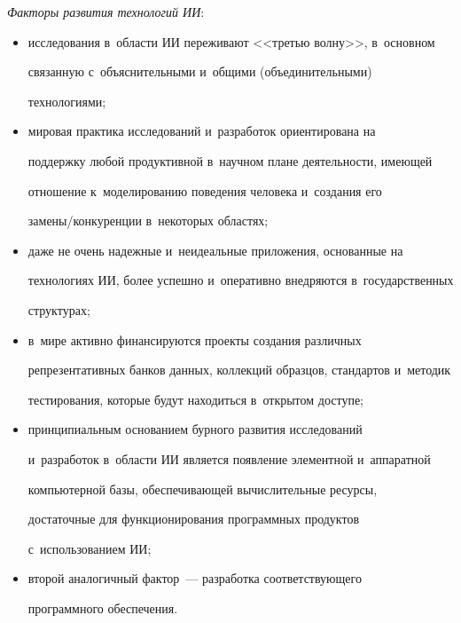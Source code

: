   

  \smallskip

  

  \textit{Факторы развития технологий ИИ}:

  \begin{itemize}

\item исследования в~области ИИ переживают <<третью волну>>, в~основном 

связанную с~объяснительными и~общими (объединительными) 

технологиями;

\item мировая практика исследований и~разработок ориентирована на 

поддержку любой продуктивной в~научном плане деятельности, имеющей 

отношение к~моделированию поведения человека и~создания его 

за\-ме\-ны\!/\!кон\-ку\-рен\-ции в~некоторых областях;

\item даже не очень надежные и~неидеальные приложения, основанные на 

технологиях ИИ, более успешно и~оперативно внедряются в~государственных 

структурах;

\item в~мире активно финансируются проекты создания различных 

репрезентативных банков данных, коллекций образцов, стандартов и~методик 

тестирования, которые будут находиться в~открытом доступе;

\item принципиальным основанием бурного развития исследований 

и~разработок в~области ИИ является появление элементной и~аппаратной 

компьютерной базы, обеспечивающей вычислительные ресурсы, 

достаточные для функционирования программных продуктов 

с~использованием ИИ;

\item второй аналогичный фактор~--- разработка соответствующего 

программного обеспечения.

\end{itemize}

  

